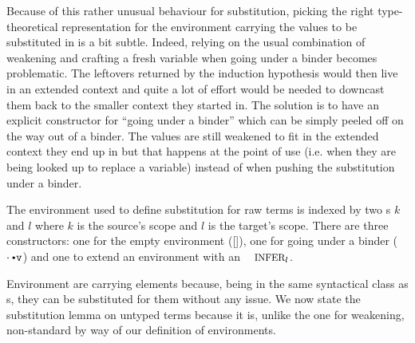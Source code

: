 Because of this rather unusual behaviour for substitution, picking
the right type-theoretical representation for the environment
carrying the values to be substituted in is a bit subtle. Indeed,
relying on the usual combination of weakening and crafting a fresh
variable when going under a binder becomes problematic. The leftovers
returned by the induction hypothesis would then live in an extended
context and quite a lot of effort would be needed to downcast them
back to the smaller context they started in. The solution is to have
an explicit constructor for ``going under a binder'' which can be
simply peeled off on the way out of a binder. The values are still
weakened to fit in the extended context they end up in but that happens
at the point of use (i.e. when they are being looked up to replace a
variable) instead of when pushing the substitution under a binder.

\begin{definition}The environment \Env{} used to define substitution
for raw terms is indexed by two \Nat{}s $k$ and $l$ where $k$ is the
source's scope and $l$ is the target's scope. There are three constructors:
one for the empty environment ([]), one for going under a binder
(\ensuremath{\cdot\envextend{}})
and one to extend an environment with an $\Inferable{l}$.
\end{definition}

Environment are carrying \Inferable{} elements because, being in the
same syntactical class as \Var{}s, they can be substituted for them
without any issue. We now state the substitution lemma on untyped terms
because it is, unlike the one for weakening, non-standard by way of our
definition of environments.

